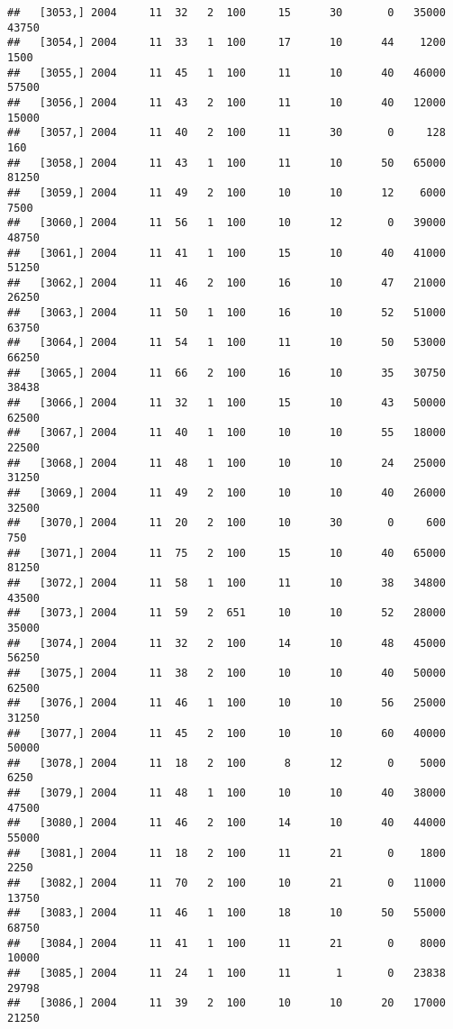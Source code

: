 \documentclass{article}\usepackage[]{graphicx}\usepackage[]{color}
\makeatletter
\newenvironment{kframe}{%
 \def\at@end@of@kframe{}%
 \ifinner\ifhmode%
  \def\at@end@of@kframe{\end{minipage}}%
  \begin{minipage}{\columnwidth}%
 \fi\fi%
 \def\FrameCommand##1{\hskip\@totalleftmargin \hskip-\fboxsep
 \colorbox{shadecolor}{##1}\hskip-\fboxsep
     \hskip-\linewidth \hskip-\@totalleftmargin \hskip\columnwidth}%
 \MakeFramed {\advance\hsize-\width
   \@totalleftmargin\z@ \linewidth\hsize
   \@setminipage}}%
 {\par\unskip\endMakeFramed%
 \at@end@of@kframe}
\newenvironment{knitrout}{}{} %
\makeatother
\begin{document}
\begin{knitrout}
\begin{kframe}
\begin{verbatim}
##   [3053,] 2004     11  32   2  100     15      30       0   35000   43750
##   [3054,] 2004     11  33   1  100     17      10      44    1200    1500
##   [3055,] 2004     11  45   1  100     11      10      40   46000   57500
##   [3056,] 2004     11  43   2  100     11      10      40   12000   15000
##   [3057,] 2004     11  40   2  100     11      30       0     128     160
##   [3058,] 2004     11  43   1  100     11      10      50   65000   81250
##   [3059,] 2004     11  49   2  100     10      10      12    6000    7500
##   [3060,] 2004     11  56   1  100     10      12       0   39000   48750
##   [3061,] 2004     11  41   1  100     15      10      40   41000   51250
##   [3062,] 2004     11  46   2  100     16      10      47   21000   26250
##   [3063,] 2004     11  50   1  100     16      10      52   51000   63750
##   [3064,] 2004     11  54   1  100     11      10      50   53000   66250
##   [3065,] 2004     11  66   2  100     16      10      35   30750   38438
##   [3066,] 2004     11  32   1  100     15      10      43   50000   62500
##   [3067,] 2004     11  40   1  100     10      10      55   18000   22500
##   [3068,] 2004     11  48   1  100     10      10      24   25000   31250
##   [3069,] 2004     11  49   2  100     10      10      40   26000   32500
##   [3070,] 2004     11  20   2  100     10      30       0     600     750
##   [3071,] 2004     11  75   2  100     15      10      40   65000   81250
##   [3072,] 2004     11  58   1  100     11      10      38   34800   43500
##   [3073,] 2004     11  59   2  651     10      10      52   28000   35000
##   [3074,] 2004     11  32   2  100     14      10      48   45000   56250
##   [3075,] 2004     11  38   2  100     10      10      40   50000   62500
##   [3076,] 2004     11  46   1  100     10      10      56   25000   31250
##   [3077,] 2004     11  45   2  100     10      10      60   40000   50000
##   [3078,] 2004     11  18   2  100      8      12       0    5000    6250
##   [3079,] 2004     11  48   1  100     10      10      40   38000   47500
##   [3080,] 2004     11  46   2  100     14      10      40   44000   55000
##   [3081,] 2004     11  18   2  100     11      21       0    1800    2250
##   [3082,] 2004     11  70   2  100     10      21       0   11000   13750
##   [3083,] 2004     11  46   1  100     18      10      50   55000   68750
##   [3084,] 2004     11  41   1  100     11      21       0    8000   10000
##   [3085,] 2004     11  24   1  100     11       1       0   23838   29798
##   [3086,] 2004     11  39   2  100     10      10      20   17000   21250

\end{verbatim}
\end{kframe}
\end{knitrout}
\end{document}
